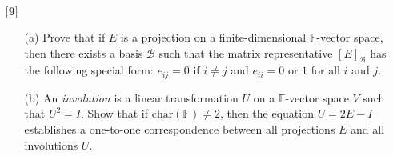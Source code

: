 \documentclass[12pt]{article}
\begin{document}
\begin{itemize}
\begin{itemize}
\begin{proof}
        We can take a similar look at $FE = F$ and see if this weren't true there would exist some vector $y$ in $V$ such that,
        \[(F-FE)(y) \neq 0\]
        Assuming this vector did indeed exist,
        \begin{align*}
            (F- FE)(y) &\neq 0 \\
            F(y) - FE(y) &\neq 0 \\
            F(y - E(y)) &\neq 0
        \end{align*}
        it would mean $(y- E(y))$ is not in the kernel of $E$. We see though,
        \begin{align*}
            E(y - E(y)) &\neq 0 \\
            E(y) -E(E(y)) &\neq 0 && \text{Projections are idempotent} \\
            E(y) - E(y) &\neq 0 \\
            E(y) &\neq E(y)
        \end{align*}
        which is again a contradiction. Therefore if the kernel of $E$ and $F$ are equal then $EF = E$ and $FE = F$

        Putting all this together: $\ker(F) = \ker(E)$ if and only if $EF = E$ and $FE = E$
    
    \end{proof}
    
    \end{itemize}
    
    \vspace{.5cm}
    \item[$\textbf{[9]}$]
    \begin{itemize}
    
    \item[(a)]
    Prove that if $E$ is a projection on a finite-dimensional $\mathbb{F}$-vector space, then there exists a basis $\mathcal{B}$ such that the matrix representative $[E]_\mathcal{B}$ has the following special form: $e_{ij} = 0$ if $i \neq j$ and $e_{ii} = 0$ or $1$ for all $i$ and $j$. 
    
    \vspace{.3cm}
    \item[(b)]
    An \textit{involution} is a linear transformation $U$ on a $\mathbb{F}$-vector space $V$ such that $U^2 = I$. Show that if $\text{char}(\mathbb{F}) \neq 2$, then the equation $U = 2E - I$ establishes a one-to-one correspondence between all projections $E$ and all involutions $U$.
    

\end{itemize}
\end{itemize}
\end{document}
